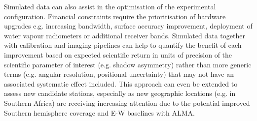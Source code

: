 Simulated data can also assist in the optimisation of the experimental configuration. Financial constraints require the prioritisation of hardware upgrades e.g. increasing bandwidth, surface accuracy improvement, deployment of water vapour radiometers or additional receiver bands. Simulated data together with calibration and imaging pipelines can help to quantify the benefit of each improvement based on expected scientific return in units of precision of the scientific parameter of interest (e.g. shadow asymmetry) rather than more generic terms (e.g. angular resolution, positional uncertainty) that may not have an associated systematic effect included. This approach can even be extended to assess new candidate stations, especially as new geographic locations (e.g. in Southern Africa) are receiving increasing attention due to the potential improved Southern hemisphere coverage and E-W baselines with ALMA.


